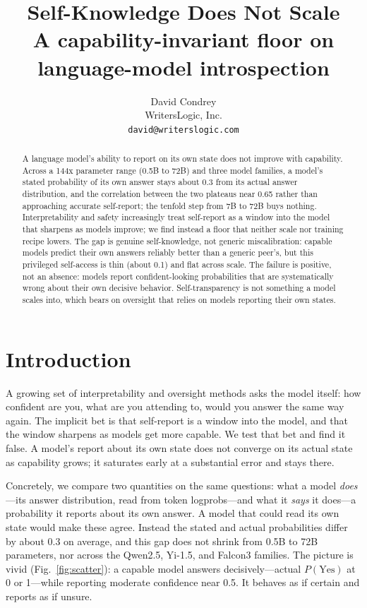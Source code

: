 \documentclass[10pt,twocolumn]{article}
\title{\textbf{\Large Self-Knowledge Does Not Scale}\\[3pt]
\normalsize A capability-invariant floor on language-model introspection}
\author{David Condrey \\ \small WritersLogic, Inc. \\ \small \texttt{david@writerslogic.com}}
\date{}
\begin{document}
\twocolumn[
\begin{@twocolumnfalse}
\maketitle
\vspace{0.4em}
\end{@twocolumnfalse}
]

\begin{abstract}
\noindent A language model's ability to report on its own state does not improve with capability. Across a
144x parameter range (0.5B to 72B) and three model families, a model's stated probability of its own answer
stays about 0.3 from its actual answer distribution, and the correlation between the two plateaus near 0.65
rather than approaching accurate self-report; the tenfold step from 7B to 72B buys nothing. Interpretability
and safety increasingly treat self-report as a window into the model that sharpens as models improve; we
find instead a floor that neither scale nor training recipe lowers. The gap is genuine self-knowledge, not
generic miscalibration: capable models predict their own answers reliably better than a generic peer's, but
this privileged self-access is thin (about 0.1) and flat across scale. The failure is positive, not an
absence: models report confident-looking probabilities that are systematically wrong about their own
decisive behavior. Self-transparency is not something a model scales into, which bears on oversight that
relies on models reporting their own states.
\end{abstract}

\section{Introduction}
A growing set of interpretability and oversight methods asks the model itself: how confident are you, what
are you attending to, would you answer the same way again. The implicit bet is that self-report is a window
into the model, and that the window sharpens as models get more capable. We test that bet and find it
false. A model's report about its own state does not converge on its actual state as capability grows; it
saturates early at a substantial error and stays there.

Concretely, we compare two quantities on the same questions: what a model \emph{does}---its answer
distribution, read from token logprobs---and what it \emph{says} it does---a probability it reports about
its own answer. A model that could read its own state would make these agree. Instead the stated and actual
probabilities differ by about 0.3 on average, and this gap does not shrink from 0.5B to 72B parameters, nor
across the Qwen2.5, Yi-1.5, and Falcon3 families. The picture is vivid (Fig.~\ref{fig:scatter}): a capable
model answers decisively---actual $P(\text{Yes})$ at 0 or 1---while reporting moderate confidence near 0.5.
It behaves as if certain and reports as if unsure.
\end{document}
